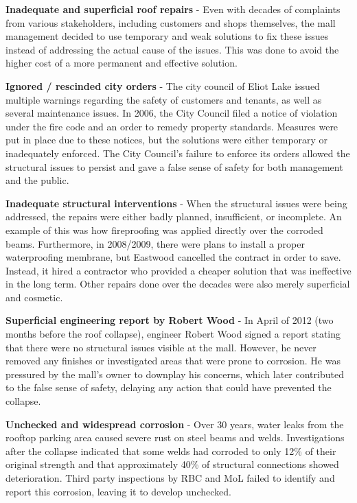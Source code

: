 \documentclass[12pt]{article}
\begin{document}
\textbf{Inadequate and superficial roof repairs} - Even with decades of complaints from various stakeholders, including customers and shops themselves, the mall management decided to use temporary and weak solutions to fix these issues instead of addressing the actual cause of the issues. This was done to avoid the higher cost of a more permanent and effective solution.
 
\textbf{Ignored / rescinded city orders} - The city council of Eliot Lake issued multiple warnings regarding the safety of customers and tenants, as well as several maintenance issues. In 2006, the City Council filed a notice of violation under the fire code and an order to remedy property standards. Measures were put in place due to these notices, but the solutions were either temporary or inadequately enforced. The City Council's failure to enforce its orders allowed the structural issues to persist and gave a false sense of safety for both management and the public.

\textbf{Inadequate structural interventions} - When the structural issues were being addressed, the repairs were either badly planned, insufficient, or incomplete. An example of this was how fireproofing was applied directly over the corroded beams. Furthermore, in 2008/2009, there were plans to install a proper waterproofing membrane, but Eastwood cancelled the contract in order to save. Instead, it hired a contractor who provided a cheaper solution that was ineffective in the long term. Other repairs done over the decades were also merely superficial and cosmetic.

\textbf{Superficial engineering report by Robert Wood} - In April of 2012 (two months before the roof collapse), engineer Robert Wood signed a report stating that there were no structural issues visible at the mall. However, he never removed any finishes or investigated areas that were prone to corrosion. He was pressured by the mall's owner to downplay his concerns, which later contributed to the false sense of safety, delaying any action that could have prevented the collapse.

\textbf{Unchecked and widespread corrosion} - Over 30 years, water leaks from the rooftop parking area caused severe rust on steel beams and welds. Investigations after the collapse indicated that some welds had corroded to only 12\% of their original strength and that approximately 40\% of structural connections showed deterioration. Third party inspections by RBC and MoL failed to identify and report this corrosion, leaving it to develop unchecked. 
\end{document}
